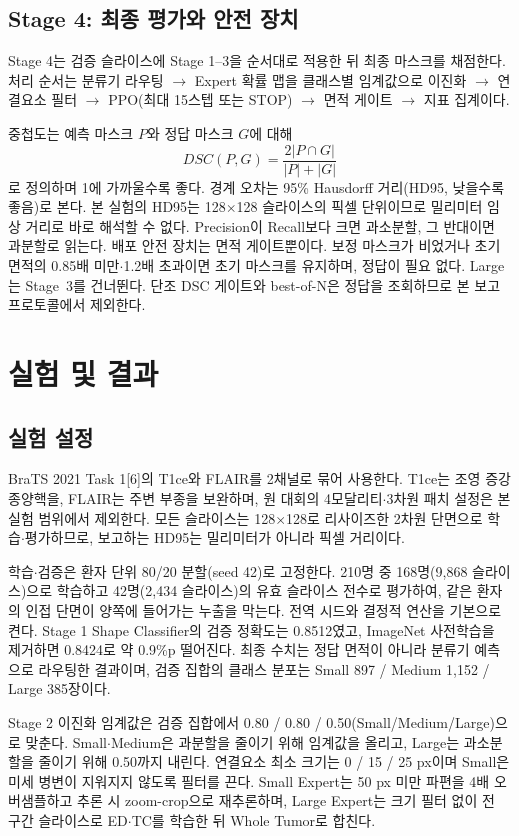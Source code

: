 \documentclass[11pt,a4paper]{article}
\begin{document}
\subsection{Stage 4: 최종 평가와 안전 장치}
Stage 4는 검증 슬라이스에 Stage 1--3을 순서대로 적용한 뒤 최종 마스크를 채점한다. 처리 순서는 분류기 라우팅 $\rightarrow$ Expert 확률 맵을 클래스별 임계값으로 이진화 $\rightarrow$ 연결요소 필터 $\rightarrow$ PPO(최대 15스텝 또는 STOP) $\rightarrow$ 면적 게이트 $\rightarrow$ 지표 집계이다.

중첩도는 예측 마스크 $P$와 정답 마스크 $G$에 대해
\begin{equation}
DSC(P,G) = \frac{2|P \cap G|}{|P| + |G|}
\end{equation}
로 정의하며 1에 가까울수록 좋다.
경계 오차는 95\% Hausdorff 거리(HD95, 낮을수록 좋음)로 본다.
본 실험의 HD95는 128$\times$128 슬라이스의 픽셀 단위이므로 밀리미터 임상 거리로 바로 해석할 수 없다. Precision이 Recall보다 크면 과소분할, 그 반대이면 과분할로 읽는다. 배포 안전 장치는 면적 게이트뿐이다. 보정 마스크가 비었거나 초기 면적의 0.85배 미만$\cdot$1.2배 초과이면 초기 마스크를 유지하며, 정답이 필요 없다. Large는 Stage~3를 건너뛴다. 단조 DSC 게이트와 best-of-N은 정답을 조회하므로 본 보고 프로토콜에서 제외한다.

\section{실험 및 결과}
\subsection{실험 설정}
BraTS 2021 Task 1[6]의 T1ce와 FLAIR를 2채널로 묶어 사용한다. T1ce는 조영 증강 종양핵을, FLAIR는 주변 부종을 보완하며, 원 대회의 4모달리티$\cdot$3차원 패치 설정은 본 실험 범위에서 제외한다. 모든 슬라이스는 128$\times$128로 리사이즈한 2차원 단면으로 학습$\cdot$평가하므로, 보고하는 HD95는 밀리미터가 아니라 픽셀 거리이다.

학습$\cdot$검증은 환자 단위 80/20 분할(seed 42)로 고정한다. 210명 중 168명(9,868 슬라이스)으로 학습하고 42명(2,434 슬라이스)의 유효 슬라이스 전수로 평가하여, 같은 환자의 인접 단면이 양쪽에 들어가는 누출을 막는다. 전역 시드와 결정적 연산을 기본으로 켠다. Stage 1 Shape Classifier의 검증 정확도는 0.8512였고, ImageNet 사전학습을 제거하면 0.8424로 약 0.9\%p 떨어진다. 최종 수치는 정답 면적이 아니라 분류기 예측으로 라우팅한 결과이며, 검증 집합의 클래스 분포는 Small 897 / Medium 1,152 / Large 385장이다.

Stage 2 이진화 임계값은 검증 집합에서 0.80 / 0.80 / 0.50(Small/Medium/Large)으로 맞춘다. Small$\cdot$Medium은 과분할을 줄이기 위해 임계값을 올리고, Large는 과소분할을 줄이기 위해 0.50까지 내린다. 연결요소 최소 크기는 0 / 15 / 25 px이며 Small은 미세 병변이 지워지지 않도록 필터를 끈다. Small Expert는 50 px 미만 파편을 4배 오버샘플하고 추론 시 zoom-crop으로 재추론하며, Large Expert는 크기 필터 없이 전 구간 슬라이스로 ED$\cdot$TC를 학습한 뒤 Whole Tumor로 합친다.
\end{document}
